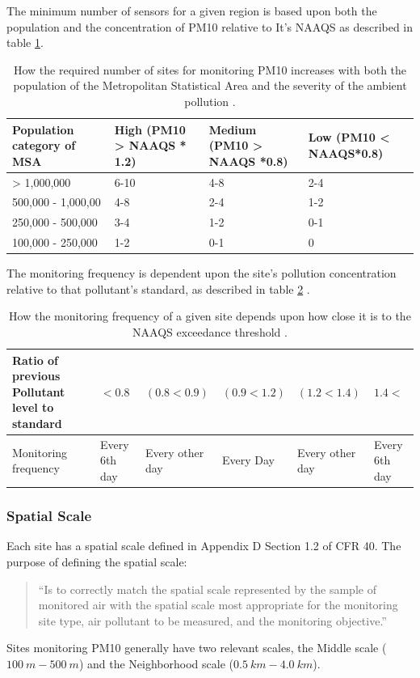 The minimum number of sensors for a given region is based upon both the population and the concentration of \ac{PM10} relative to It's \ac{NAAQS} as described in table \ref{tab:NAAQS_site_count}.
\begin{table}[ht]
	\centering
	\begin{tabular}{p{}|p{}|p{}|p{}}
		Population category of \ac{MSA} & High (PM10 > \ac{NAAQS} * 1.2) & Medium (PM10 > \ac{NAAQS} *0.8) & Low (PM10 < \ac{NAAQS}*0.8) \\
		\hline
		> 1,000,000 & 6-10 & 4-8 & 2-4 \\
		500,000 - 1,000,00 & 4-8 & 2-4 & 1-2 \\
		250,000 - 500,000 & 3-4 & 1-2 & 0-1 \\
		100,000 - 250,000 & 1-2 & 0-1 & 0 \\
	\end{tabular}
	\caption{How the required number of sites for monitoring PM10 increases with both the population of the Metropolitan Statistical Area and the severity of the ambient pollution \citep{CFR:Title40-58}. }
	\label{tab:NAAQS_site_count}
\end{table}

The monitoring frequency is dependent upon the site's pollution concentration relative to that pollutant's standard, as described in table \ref{tab:EPA_monitoring_freq}  \citep{AQMNP:2019}.

\begin{table}[ht]
	\centering
	\begin{tabular}{p{}|p{}|p{}|p{}|p{}|p{}}
		Ratio of previous Pollutant level to standard & $<0.8$ & $(0.8 < 0.9)$ & $(0.9 < 1.2)$ & $(1.2 < 1.4)$ & $1.4<$  \\
		\hline
		Monitoring frequency & Every 6th day & Every other day & Every Day & Every other day & Every 6th day \\ 
	\end{tabular}
	\caption{How the monitoring frequency of a given site depends upon how close it is to the \ac{NAAQS} exceedance threshold \citep{AQMNP:2019}.}
	\label{tab:EPA_monitoring_freq}
\end{table}

\subsubsection*{Spatial Scale}
\label{subsubsec:spatscale}
Each site has a spatial scale defined in Appendix D Section 1.2 of \ac{CFR} 40. The purpose of defining the spatial scale:
\begin{quote}
	``Is to correctly match the spatial scale represented by the sample of monitored air with the spatial scale most appropriate for the monitoring site type, air pollutant to be measured, and the monitoring objective.''  \cite{CFR:Title40-58}
\end{quote}
Sites monitoring \ac{PM10} generally have two relevant scales, the Middle scale ($100~m - 500~m$) and the Neighborhood scale ($0.5~km - 4.0~km$).  

